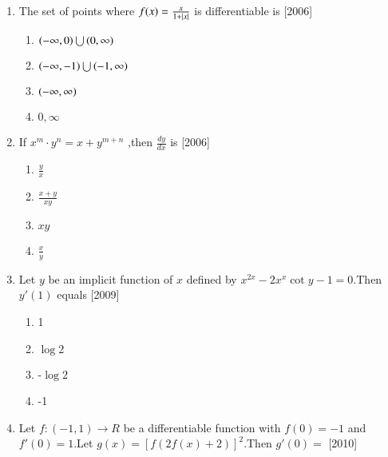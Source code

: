 \documentclass[journal,12pt,twocolumn]{IEEEtran}
\theoremstyle{remark}
\begin{document}
\begin{enumerate}
\begin{multicols}{4}
   
    \begin{enumerate}
    \item 24
    \item 36
    \item 12
    \item 18
    \end{enumerate}
     \end{multicols}
    \item The set of points where $f(x)=\frac{x}{1+\left\vert x\right\vert}$ is differentiable is \hfill[2006]\break
    \begin{multicols}{2}
    
    \begin{enumerate}
    \item $\left(-\infty,0\right)\bigcup\left(0,\infty\right)$
    \item $\left(-\infty,-1\right)\bigcup\left(-1,\infty\right)$
    \item $\left(-\infty,\infty\right)$
    \item ${0,\infty}$
    \end{enumerate}
    \end{multicols}
    \item If $x^m\cdot y^n={x+y}^{m+n}$ ,then $\frac{dy}{dx}$ is \hfill[2006]\break
    \begin{multicols}{4}
        
  
    \begin{enumerate}
    \item $\frac{y}{x}$
    \item $\frac{x+y}{xy}$
    \item $xy$
    \item $\frac{x}{y}$
    \end{enumerate}
    \end{multicols}
    \item Let $y$ be an implicit function of $x$ defined by $x^{2x}-2x^x\cot{y}-1=0$.Then $y'(1)$ equals
    \hfill[2009]\break
    \begin{multicols}{4}
    \begin{enumerate}
    \item 1
    \item $\log2$
    \item -$\log2$
    \item -1
    \end{enumerate}
    \end{multicols}
    \item Let $f:(-1,1)\rightarrow R$ be a differentiable function with $f(0)=-1$ and $f'(0)=1$.Let $g(x)=[f(2f(x)+2)]^2$.Then $g'(0)=$
	    \hfill[2010]
     \begin{multicols}{4}
         

\end{multicols}
\end{enumerate}
\end{document}
